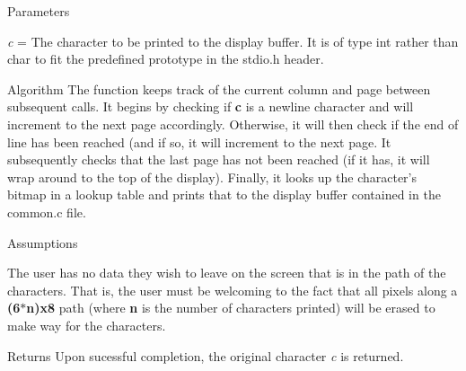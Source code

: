 \begin{DoxyParagraph}{Parameters}

\begin{DoxyItemize}
\item {\itshape c} = The character to be printed to the display buffer. It is of type int rather than char to fit the predefined prototype in the stdio.\-h header.
\end{DoxyItemize}
\end{DoxyParagraph}
\begin{DoxyParagraph}{Algorithm}
The function keeps track of the current column and page between subsequent calls. It begins by checking if {\bfseries c} is a newline character and will increment to the next page accordingly. Otherwise, it will then check if the end of line has been reached (and if so, it will increment to the next page. It subsequently checks that the last page has not been reached (if it has, it will wrap around to the top of the display). Finally, it looks up the character's bitmap in a lookup table and prints that to the display buffer contained in the common.\-c file.
\end{DoxyParagraph}
\begin{DoxyParagraph}{Assumptions}

\begin{DoxyItemize}
\item The user has no data they wish to leave on the screen that is in the path of the characters. That is, the user must be welcoming to the fact that all pixels along a {\bfseries  (6$\ast$n)x8 } path (where {\bfseries n} is the number of characters printed) will be erased to make way for the characters.
\end{DoxyItemize}
\end{DoxyParagraph}
\begin{DoxyReturn}{Returns}
Upon sucessful completion, the original character {\itshape c} is returned. 
\end{DoxyReturn}
